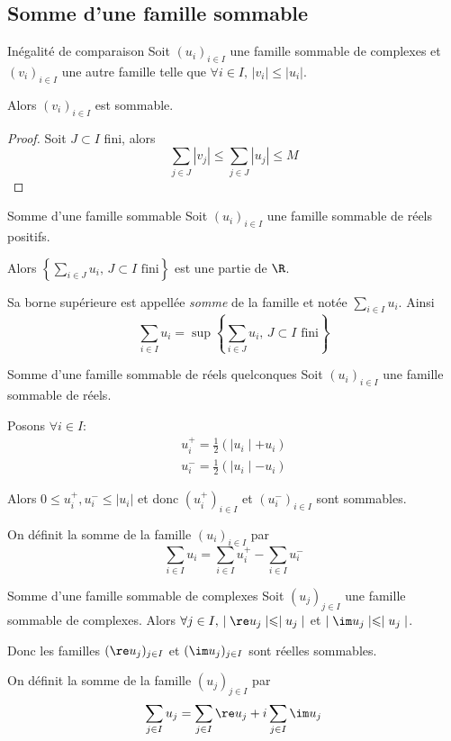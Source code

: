 \subsection{Somme d'une famille sommable }

\begin{proposition}{Inégalité de comparaison}{}
    Soit $(u_i)_{i \in I}$ une famille sommable de complexes et $(v_i)_{i \in I}$
    une autre famille telle que $\forall i \in I, \, |v_i| \leqslant |u_i|$.

    Alors $(v_i)_{i \in I}$ est sommable.
\end{proposition}

\begin{proof}
    Soit $J \subset I$ fini, alors
    $$\sum_{j \in J} |v_j| \leqslant \sum_{j \in J} |u_j| \leqslant M$$
\end{proof}


\begin{definition}{Somme d'une famille sommable}{}
    Soit $(u_i)_{i \in I}$ une famille sommable de réels positifs. 

    Alors $\displaystyle \left\{ \sum_{i \in J} u_i, \, J \subset I \text{ fini}  \right\}$ est une partie 
    de $\R$. 

    Sa borne supérieure est appellée \emph{somme} de la famille et notée $\displaystyle \sum_{i \in I} u_i$.
    Ainsi $$\sum_{i \in I} u_i = \sup \left\{ \sum_{i \in J} u_i, \, J \subset I \text{ fini}  \right\}$$
\end{definition}

\begin{theoreme}{Somme d'une famille sommable de réels quelconques}{}
    Soit $(u_i)_{i \in I}$ une famille sommable de réels. 

    Posons $\forall i \in I : $ 
    \begin{align*}
        u_i^+ = \frac 1 2 (\mid u_i \mid + u_i)\\
        u_i^- = \frac 1 2 (\mid u_i \mid - u_i)
    \end{align*}

    Alors $0 \leqslant u_i^+, u_i^- \leqslant |u_i|$ et donc $(u_i^+)_{i \in I}$ et $(u_i^-)_{i \in I}$ sont sommables.

    On définit la somme de la famille $(u_i)_{i \in I}$ par
    $$\sum_{i \in I} u_i = \sum_{i \in I} u_i^+ - \sum_{i \in I} u_i^-$$
\end{theoreme}

\begin{theoreme}{Somme d'une famille sommable de complexes}{}
    Soit $(u_j)_{j \in I}$ une famille sommable de complexes. Alors
    $\forall j \in I, \, \mid \re u_j \mid \leqslant \mid u_j \mid$ et $\mid \im u_j \mid \leqslant \mid u_j \mid$.

    Donc les familles $(\re u_j)_{j \in I}$ et $(\im u_j)_{j \in I}$ sont réelles sommables.

    On définit la somme de la famille $(u_j)_{j \in I}$ par
    $$\sum_{j \in I} u_j = \sum_{j \in I} \re u_j + i \sum_{j \in I} \im u_j$$

\end{theoreme}


